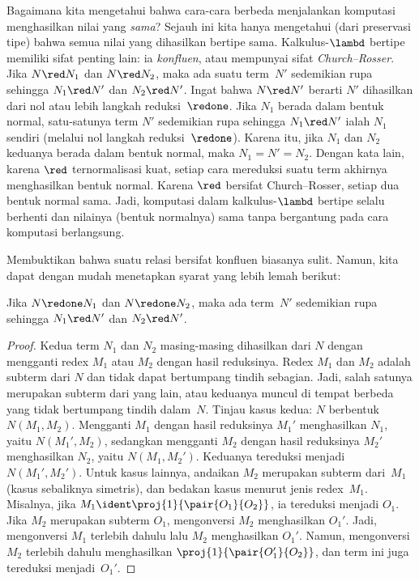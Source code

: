 \documentclass[../../../include/open-logic-section]{subfiles}
\begin{document}
Bagaimana kita mengetahui bahwa cara-cara berbeda menjalankan komputasi
menghasilkan nilai yang \emph{sama}? Sejauh ini kita hanya mengetahui
(dari preservasi tipe) bahwa semua nilai yang dihasilkan bertipe sama.
Kalkulus-$\lambd$ bertipe memiliki sifat penting lain: ia
\emph{konfluen}, atau mempunyai sifat \emph{Church--Rosser}. Jika
$N \red N_1$ dan $N \red N_2$, maka ada suatu term~$N'$ sedemikian rupa
sehingga $N_1 \red N'$ dan $N_2 \red N'$. Ingat bahwa $N \red N'$
berarti $N'$ dihasilkan dari nol atau lebih langkah reduksi~$\redone$.
Jika $N_1$ berada dalam bentuk normal, satu-satunya term $N'$ sedemikian
rupa sehingga $N_1 \red N'$ ialah $N_1$ sendiri (melalui nol langkah
reduksi~$\redone$). Karena itu, jika $N_1$ dan $N_2$ keduanya berada
dalam bentuk normal, maka $N_1 = N' = N_2$. Dengan kata lain, karena
$\red$ ternormalisasi kuat, setiap cara mereduksi suatu term akhirnya
menghasilkan bentuk normal. Karena $\red$ bersifat Church--Rosser, setiap
dua bentuk normal sama. Jadi, komputasi dalam kalkulus-$\lambd$ bertipe
selalu berhenti dan nilainya (bentuk normalnya) sama tanpa bergantung pada
cara komputasi berlangsung.

Membuktikan bahwa suatu relasi bersifat konfluen biasanya sulit. Namun,
kita dapat dengan mudah menetapkan syarat yang lebih lemah berikut:

\begin{prop}
Jika $N \redone N_1$ dan $N \redone N_2$, maka ada term~$N'$ sedemikian
rupa sehingga $N_1 \red N'$ dan $N_2 \red N'$.
\end{prop}

\begin{proof}
  Kedua term $N_1$ dan $N_2$ masing-masing dihasilkan dari $N$ dengan
  mengganti redex $M_1$ atau $M_2$ dengan hasil reduksinya. Redex
  $M_1$ dan $M_2$ adalah subterm dari $N$ dan tidak dapat bertumpang
  tindih sebagian. Jadi, salah satunya merupakan subterm dari yang lain,
  atau keduanya muncul di tempat berbeda yang tidak bertumpang tindih
  dalam~$N$. Tinjau kasus kedua: $N$ berbentuk $N(M_1,M_2)$. Mengganti
  $M_1$ dengan hasil reduksinya $M_1'$ menghasilkan $N_1$, yaitu
  $N(M_1',M_2)$, sedangkan mengganti $M_2$ dengan hasil reduksinya $M_2'$
  menghasilkan $N_2$, yaitu $N(M_1,M_2')$. Keduanya tereduksi menjadi
  $N(M_1',M_2')$. Untuk kasus lainnya, andaikan $M_2$ merupakan subterm
  dari~$M_1$ (kasus sebaliknya simetris), dan bedakan kasus menurut jenis
  redex~$M_1$. Misalnya, jika $M_1 \ident
  \proj{1}{\pair{O_1}{O_2}}$, ia tereduksi menjadi $O_1$. Jika $M_2$
  merupakan subterm $O_1$, mengonversi $M_2$ menghasilkan $O_1'$.
  Jadi, mengonversi $M_1$ terlebih dahulu lalu $M_2$ menghasilkan
  $O_1'$. Namun, mengonversi $M_2$ terlebih dahulu menghasilkan
  $\proj{1}{\pair{O_1'}{O_2}}$, dan term ini juga tereduksi
  menjadi~$O_1'$.
\end{proof}
\end{document}
